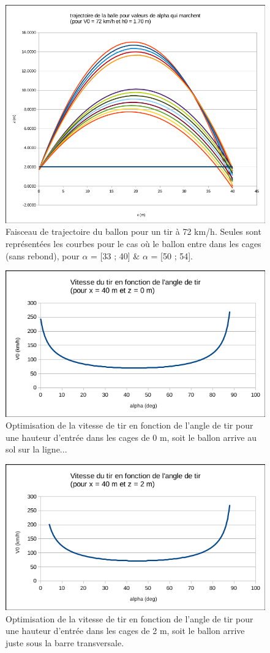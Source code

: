 \documentclass[french,a4paper,10pt]{article}
\begin{document}
\begin{reponse}
\begin{figure}[h]
    \includegraphics[width=.8\linewidth]{courbe_trajectoires_alpha.png}
    \caption{Faisceau de trajectoire du ballon pour un tir à 72 km/h. Seules sont représentées les courbes pour le cas où le ballon entre dans les cages (sans rebond), pour $\alpha$ = [33 ; 40] \& $\alpha$ = [50 ; 54].}
\end{figure}

\begin{figure}[h]
    \includegraphics[width=.8\linewidth]{courbe_V0@0.png}
    \caption{Optimisation de la vitesse de tir en fonction de l'angle de tir pour une hauteur d'entrée dans les cages de 0 m, soit le ballon arrive au sol sur la ligne...}
\end{figure}

\begin{figure}[h]
    \includegraphics[width=.8\linewidth]{courbe_V0@2.png}
    \caption{Optimisation de la vitesse de tir en fonction de l'angle de tir pour une hauteur d'entrée dans les cages de 2 m, soit le ballon arrive juste sous la barre transversale.}
\end{figure}
\end{reponse}
\end{document}
